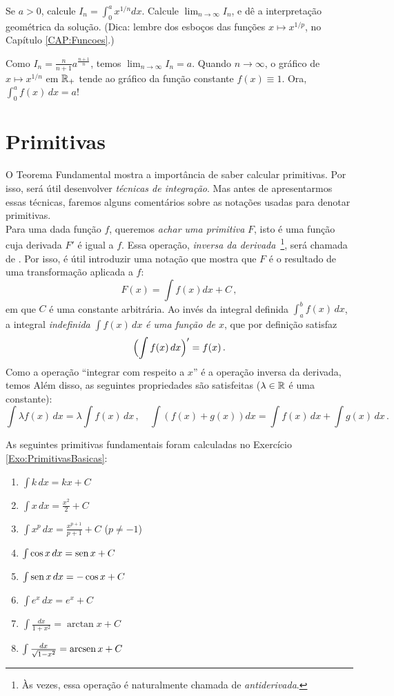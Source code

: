 \begin{exo}
Se $a>0$, calcule $I_n=\int_0^ax^{1/n}dx$. Calcule $\lim_{n\to \infty}I_n$, e dê
a interpretação geométrica da solução. (Dica: lembre dos esboços das funções
$x\mapsto x^{1/p}$, no Capítulo \ref{CAP:Funcoes}.)
\begin{sol}
Como $I_n=\frac{n}{n+1}a^{\frac{n+1}{n}}$, temos $\lim_{n\to \infty}I_n=a$.
Quando $n\to \infty$, o gráfico de $x\mapsto x^{1/n}$ em $\mathbb{R}_+$ tende
ao gráfico da função constante $f(x)\equiv 1$. Ora, $\int_0^a f(x)\,dx=a$!
\end{sol}
\end{exo}

\section{Primitivas}
O Teorema Fundamental mostra a importância de saber calcular
primitivas. Por isso, será útil desenvolver \emph{técnicas de
integração}.
Mas antes de apresentarmos essas técnicas, 
faremos alguns comentários sobre as notações usadas para denotar
primitivas.\\

Para uma dada função $f$, queremos \emph{achar uma primitiva} $F$, isto é 
uma função cuja derivada $F'$ é igual a $f$. Essa operação, \emph{inversa da
derivada}~\footnote{Às vezes, essa operação é naturalmente chamada de
\emph{antiderivada}.}, será chamada de .
Por isso, é útil introduzir uma notação que mostra que
$F$ é o resultado de uma transformação aplicada a $f$:
$$F(x)=\int f(x)dx+C\,,$$
em que $C$ é uma constante arbitrária.
Ao invés da integral definida $\int_a^bf(x)\,dx$, a integral \emph{indefinida}
$\int f(x)\,dx$ \emph{é uma função de $x$}, que por definição satisfaz 
$$\Bigl(\int f(x)\,dx\Bigr)'=f(x)\,.$$
Como a operação ``integrar com respeito a $x$'' é a operação
inversa da derivada, temos 
Além disso, as seguintes propriedades são satisfeitas ($\lambda\in \mathbb{R}$ é uma
constante):
$$\int\lambda f(x)\, dx=\lambda\int f(x)\,dx\,,\quad
\int(f(x)+g(x))dx=\int f(x)\,dx+\int g(x)\,dx\,.$$

As seguintes primitivas fundamentais foram calculadas no Exercício
\ref{Exo:PrimitivasBasicas}:
\begin{multicols}{2}
\begin{enumerate}
\item $\int k\,dx=kx+C$
\item $\int x\,dx=\frac{x^2}{2}+C$
\item\label{itPrimitFund3} $\int x^p\,dx=\frac{x^{p+1}}{p+1}+C$ ($p\neq -1$)
\item $\int \cos x\,dx=\operatorname{sen} x+C$
\item $\int \operatorname{sen} x\,dx=-\cos x+C$
\item $\int e^x\,dx=e^x+C$
\item $\int \frac{dx}{1+x^2}=\arctan x+C$
\item $\int \frac{dx}{\sqrt{1-x^2}}=\operatorname{arcsen} x+C$
\end{enumerate}
\end{multicols}
\vspace{0.01cm}

